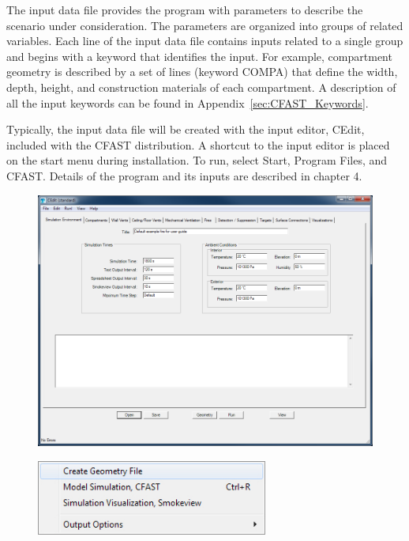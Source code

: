 The input data file provides the program with parameters to describe the scenario under consideration. The parameters are organized into groups of related variables. Each line of the input data file contains inputs related to a single group and begins with a keyword that identifies the input.  For example, compartment geometry is described by a set of lines (keyword COMPA) that define the width, depth, height, and construction materials of each compartment.  A description of all the input keywords can be found in Appendix~\ref{sec:CFAST_Keywords}.

Typically, the input data file will be created with the input editor, CEdit, included with the CFAST distribution. A shortcut to the input editor is placed on the start menu during installation.  To run, select Start, Program Files, and CFAST. Details of the program and its inputs are described in chapter 4.

\begin{figure}[h!]
\begin{center}
\includegraphics[width=6.5in]{FIGURES/Running_CFAST/Environment_Tab}
\end{center}
\end{figure}

\begin{figure}
  \includegraphics[width=3in]{FIGURES/Running_CFAST/Run_Menu}
\end{figure}

